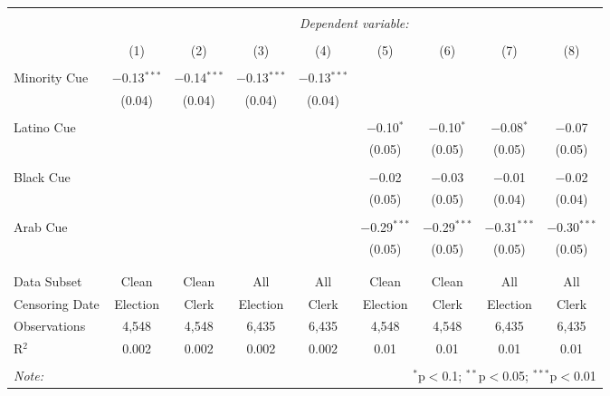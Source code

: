 
\begin{table}[!htbp] \centering 
  \caption{} 
  \label{} 
\begin{tabular}{@{\extracolsep{0pt}}lcccccccc} 
\\[-1.8ex]\hline 
\hline \\[-1.8ex] 
 & \multicolumn{8}{c}{\textit{Dependent variable:}} \\ 
\cline{2-9} 
\\[-1.8ex] & (1) & (2) & (3) & (4) & (5) & (6) & (7) & (8)\\ 
\hline \\[-1.8ex] 
 Minority Cue & $-$0.13$^{***}$ & $-$0.14$^{***}$ & $-$0.13$^{***}$ & $-$0.13$^{***}$ &  &  &  &  \\ 
  & (0.04) & (0.04) & (0.04) & (0.04) &  &  &  &  \\ 
  & & & & & & & & \\ 
 Latino Cue &  &  &  &  & $-$0.10$^{*}$ & $-$0.10$^{*}$ & $-$0.08$^{*}$ & $-$0.07 \\ 
  &  &  &  &  & (0.05) & (0.05) & (0.05) & (0.05) \\ 
  & & & & & & & & \\ 
 Black Cue &  &  &  &  & $-$0.02 & $-$0.03 & $-$0.01 & $-$0.02 \\ 
  &  &  &  &  & (0.05) & (0.05) & (0.04) & (0.04) \\ 
  & & & & & & & & \\ 
 Arab Cue &  &  &  &  & $-$0.29$^{***}$ & $-$0.29$^{***}$ & $-$0.31$^{***}$ & $-$0.30$^{***}$ \\ 
  &  &  &  &  & (0.05) & (0.05) & (0.05) & (0.05) \\ 
  & & & & & & & & \\ 
\hline \\[-1.8ex] 
Data Subset & Clean & Clean & All & All & Clean & Clean & All & All \\ 
Censoring Date & Election & Clerk & Election & Clerk & Election & Clerk & Election & Clerk \\ 
Observations & 4,548 & 4,548 & 6,435 & 6,435 & 4,548 & 4,548 & 6,435 & 6,435 \\ 
R$^{2}$ & 0.002 & 0.002 & 0.002 & 0.002 & 0.01 & 0.01 & 0.01 & 0.01 \\ 
\hline 
\hline \\[-1.8ex] 
\textit{Note:}  & \multicolumn{8}{r}{$^{*}$p$<$0.1; $^{**}$p$<$0.05; $^{***}$p$<$0.01} \\ 
\end{tabular} 
\end{table} 
